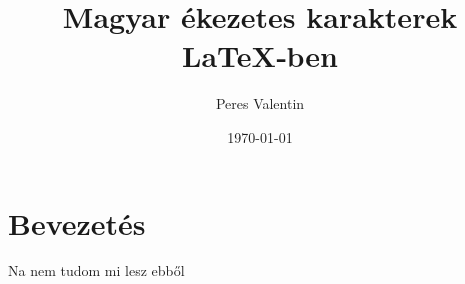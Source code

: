 \documentclass[12pt,a4paper]{article}
\title{Magyar ékezetes karakterek LaTeX‑ben}
\author{Peres Valentin}
\date{\today}
\begin{document}
\maketitle

\section{Bevezetés}
Na nem tudom mi lesz ebből 
\end{document}
